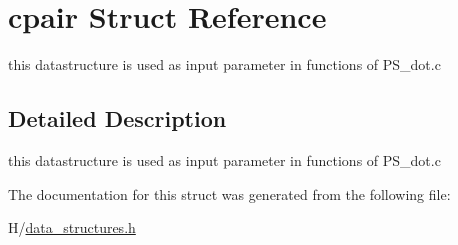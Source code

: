 \hypertarget{structcpair}{
\section{cpair Struct Reference}
\label{structcpair}
}


this datastructure is used as input parameter in functions of PS\_\-dot.c  




\subsection{Detailed Description}
this datastructure is used as input parameter in functions of PS\_\-dot.c 

The documentation for this struct was generated from the following file:\begin{DoxyCompactItemize}
\item 
H/\hyperlink{data__structures_8h}{data\_\-structures.h}\end{DoxyCompactItemize}
